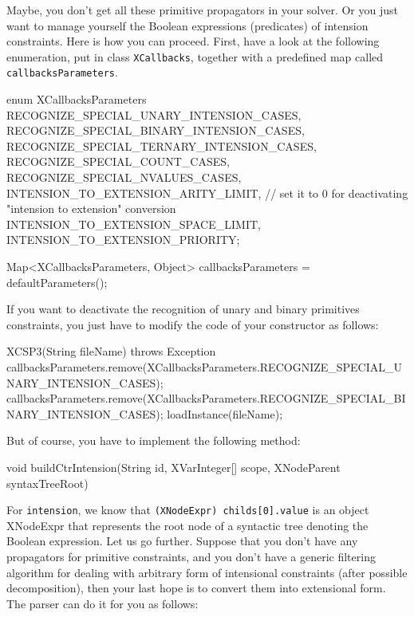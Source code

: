 \documentclass[10pt]{article}
\newenvironment{boxabsc}
               {\medskip \begin{bclogo}[barre=none,arrondi=0.2,logo=]{}\vspace{-0.6cm}}
               {\vspace{-0.1cm}\end{bclogo} \smallskip}
\newcommand{\gb}[1]{{\tt #1}} %
\newcommand{\nn}[1]{{\tt #1}} %
\begin{document}
Maybe, you don't get all these primitive propagators in your solver.
Or you just want to manage yourself the Boolean expressions (predicates) of intension constraints.
Here is how you can proceed.
First, have a look at the following enumeration, put in class \nn{XCallbacks}, together with a predefined map called \nn{callbacksParameters}.

\begin{boxabsc}
\begin{absc}
enum XCallbacksParameters {
  RECOGNIZE_SPECIAL_UNARY_INTENSION_CASES,
  RECOGNIZE_SPECIAL_BINARY_INTENSION_CASES,
  RECOGNIZE_SPECIAL_TERNARY_INTENSION_CASES,
  RECOGNIZE_SPECIAL_COUNT_CASES,
  RECOGNIZE_SPECIAL_NVALUES_CASES,
  INTENSION_TO_EXTENSION_ARITY_LIMIT, // set it to 0 for deactivating "intension to extension" conversion
  INTENSION_TO_EXTENSION_SPACE_LIMIT,
  INTENSION_TO_EXTENSION_PRIORITY;
}

Map<XCallbacksParameters, Object> callbacksParameters = defaultParameters();
\end{absc} 
\end{boxabsc}

If you want to deactivate the recognition of unary and binary primitives constraints, you just have to modify the code of your constructor as follows:

\begin{boxabsc}
\begin{absc}
XCSP3(String fileName) throws Exception {
  callbacksParameters.remove(XCallbacksParameters.RECOGNIZE_SPECIAL_UNARY_INTENSION_CASES);
  callbacksParameters.remove(XCallbacksParameters.RECOGNIZE_SPECIAL_BINARY_INTENSION_CASES);
  loadInstance(fileName); 
}
\end{absc} 
\end{boxabsc}

But of course, you have to implement the following method:

\begin{boxabsc}
\begin{absc}
void buildCtrIntension(String id, XVarInteger[] scope, XNodeParent syntaxTreeRoot) 
\end{absc} 
\end{boxabsc}


For \gb{intension}, we know that \verb!(XNodeExpr) childs[0].value! is an object XNodeExpr that represents the root node of a syntactic tree denoting the Boolean expression.
Let us go further. Suppose that you don't have any propagators for primitive constraints, and you don't have a generic filtering algorithm for dealing with arbitrary form of intensional constraints (after possible decomposition), then your last hope is to convert them into extensional form. The parser can do it for you as follows:
\end{document}
